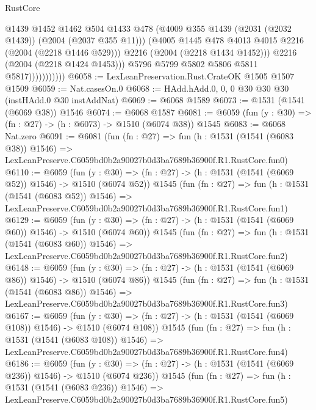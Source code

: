 \begin{lexlean}{RustCore}
\begin{coremodule}
                              @1439
                              @1452
                              @1462
                              @504
                              @1433
                              @478
                              (@4009 @355 @1439 (@2031 (@2032 @1439)) (@2004 (@2037 @355 @11)))
                              (@4005 @1445 @478 @4013 @4015 @2216 (@2004 (@2218 @1446 @529)))
                              @2216
                              (@2004 (@2218 @1434 @1452)))
                            @2216
                            (@2004 (@2218 @1424 @1453)))
                          @5796
                          @5799
                          @5802
                          @5806
                          @5811
                          @5817)))))))))))
@6058 := LexLeanPreservation.Rust.CrateOK @1505 @1507 @1509
@6059 := Nat.casesOn.{0}
@6068 := HAdd.hAdd.{0, 0, 0} @30 @30 @30 (instHAdd.{0} @30 instAddNat)
@6069 := @6068 @1589
@6073 := @1531 (@1541 (@6069 @38)) @1546
@6074 := @6068 @1587
@6081 := @6059 (fun (y : @30) => (fn : @27) -> (h : @6073) -> @1510 (@6074 @38)) @1545
@6083 := @6068 Nat.zero
@6091 := @6081
    (fun (fn : @27) =>
    fun (h : @1531 (@1541 (@6083 @38)) @1546) =>
    LexLeanPreserve.C6059bd0b2a90027b0d3ba7689b36900f.R1.RustCore.fun0)
@6110 := @6059
    (fun (y : @30) => (fn : @27) -> (h : @1531 (@1541 (@6069 @52)) @1546) -> @1510 (@6074 @52))
    @1545
    (fun (fn : @27) =>
    fun (h : @1531 (@1541 (@6083 @52)) @1546) =>
    LexLeanPreserve.C6059bd0b2a90027b0d3ba7689b36900f.R1.RustCore.fun1)
@6129 := @6059
    (fun (y : @30) => (fn : @27) -> (h : @1531 (@1541 (@6069 @60)) @1546) -> @1510 (@6074 @60))
    @1545
    (fun (fn : @27) =>
    fun (h : @1531 (@1541 (@6083 @60)) @1546) =>
    LexLeanPreserve.C6059bd0b2a90027b0d3ba7689b36900f.R1.RustCore.fun2)
@6148 := @6059
    (fun (y : @30) => (fn : @27) -> (h : @1531 (@1541 (@6069 @86)) @1546) -> @1510 (@6074 @86))
    @1545
    (fun (fn : @27) =>
    fun (h : @1531 (@1541 (@6083 @86)) @1546) =>
    LexLeanPreserve.C6059bd0b2a90027b0d3ba7689b36900f.R1.RustCore.fun3)
@6167 := @6059
    (fun (y : @30) => (fn : @27) -> (h : @1531 (@1541 (@6069 @108)) @1546) -> @1510 (@6074 @108))
    @1545
    (fun (fn : @27) =>
    fun (h : @1531 (@1541 (@6083 @108)) @1546) =>
    LexLeanPreserve.C6059bd0b2a90027b0d3ba7689b36900f.R1.RustCore.fun4)
@6186 := @6059
    (fun (y : @30) => (fn : @27) -> (h : @1531 (@1541 (@6069 @236)) @1546) -> @1510 (@6074 @236))
    @1545
    (fun (fn : @27) =>
    fun (h : @1531 (@1541 (@6083 @236)) @1546) =>
    LexLeanPreserve.C6059bd0b2a90027b0d3ba7689b36900f.R1.RustCore.fun5)

\end{coremodule}
\end{lexlean}
